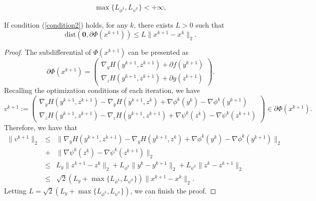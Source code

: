 \documentclass[10pt,a4paper]{amsart}
\begin{document}
\begin{equation}\label{condition2}
   \max\{L_{\phi^k},L_{\psi^k}\}<+\infty,
\end{equation}

\begin{lemma}\label{relative}
If condition (\ref{condition2}) holds, for any $k$, there exists $L>0$ such that
\begin{equation}
    \textrm{dist}(\textbf{0},\partial \Phi(x^{k+1}))\leq L\|x^{k+1}-x^k\|_2.
\end{equation}
\end{lemma}

\begin{proof}
The subdifferential of $\Phi(x^{k+1})$ can be presented as
\begin{equation}
    \partial\Phi(x^{k+1})=\left(\begin{array}{c}
                            \nabla_{y}H(y^{k+1},z^{k+1})+\partial f(y^{k+1}) \\
                             \nabla_{z}H(y^{k+1},z^{k+1})+\partial g(z^{k+1})
                          \end{array}\right).
\end{equation}
Recalling the optimization conditions of each iteration, we have
\begin{equation}
   v^{k+1}:= \left(\begin{array}{c}
                            \nabla_{y}H(y^{k+1},z^{k+1})-\nabla_{y}H(y^{k+1},z^{k})+\nabla\phi^{k}(y^{k})-\nabla\phi^{k}(y^{k+1}) \\
                             \nabla_{z}H(y^{k+1},z^{k+1})-\nabla_{z}H(y^{k+1},z^{k+1})+\nabla\psi^{k}(z^{k})-\nabla\psi^{k}(z^{k+1})
                          \end{array}\right)\in \partial\Phi(x^{k+1}).
\end{equation}
Therefore, we have that
\begin{eqnarray}
\|v^{k+1}\|_2&\leq& \|\nabla_{y}H(y^{k+1},z^{k+1})-\nabla_{y}H(y^{k+1},z^{k})+\nabla\phi^{k}(y^{k})-\nabla\phi^{k}(y^{k+1})\|_2\nonumber\\
&+&\|\nabla\psi^{k}(z^{k})-\nabla\psi^{k}(z^{k+1})\|_2\nonumber\\
&\leq&L_y\|z^{k+1}-z^{k}\|_2+L_{\phi^{k}}\|y^{k}-y^{k+1}\|_2+L_{\psi^{k}}\|z^{k}-z^{k+1}\|_2\nonumber\\
&\leq&\sqrt{2}(L_y+\max\{L_{\phi^{k}},L_{\psi^{k}}\})\|x^{k+1}-x^k\|_2.
\end{eqnarray}
Letting $L=\sqrt{2}(L_y+\max\{L_{\phi^{k}},L_{\psi^{k}}\})$, we can finish the proof.
\end{proof}
\end{document}
